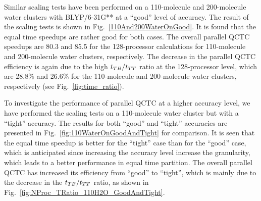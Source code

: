 \commentoutA{\documentclass[prl,aps,twocolumn,twocolumngrid,superbib]{revtex4}}
\begin{document}
 Similar scaling tests have been performed on a 110-molecule and
200-molecule water clusters with BLYP/6-31G** at a ``good'' level of
accuracy.  The result of the scaling tests is shown in
Fig.~\ref{110And200WaterOnGood}. It is found that the equal time
speedups are rather good for both cases. The overall parallel QCTC
speedups are
80.3 and 85.5 for the 128-processor calculations for 110-molecule and
200-molecule water clusters, respectively.
The decrease in the parallel QCTC efficiency is again due to the
high $t_{TB}/t_{TT}$ ratio at the 128-processor level, which are 28.8\%
and 26.6\% for the 110-molecule and 200-molecule water clusters,
respectively (see Fig.~\ref{fig:time_ratio}).

To investigate the performance of parallel QCTC at a higher accuracy
level, we have performed the scaling tests on a 110-molecule water
cluster but with a ``tight'' accuracy. The results for both ``good''
and ``tight'' accuracies are presented in
Fig.~\ref{fig:110WaterOnGoodAndTight} for comparison.  It is seen that
the equal time speedup is better for the ``tight'' case than for the
``good'' case, which is anticipated since increasing the accuracy
level increase the granularity, which leads to a better performance in
equal time partition\cite{CGan03}.  The overall parallel QCTC has
increased its efficiency from ``good'' to ``tight'', which is mainly
due to the decrease in the $t_{TB}/t_{TT}$ ratio, as shown in
Fig.~\ref{fig:NProc_TRatio_110H2O_GoodAndTight}.
\end{document}
